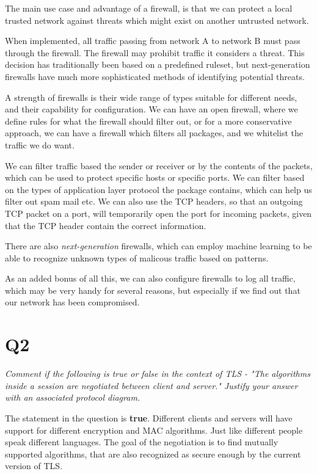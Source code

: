 \documentclass{article}
\begin{document}
The main use case and advantage of a firewall, is that we can protect a local trusted network against threats which might exist on another untrusted network.

When implemented, all traffic passing from network A to network B must pass through the firewall. The firewall may prohibit traffic it considers a threat. This decision has traditionally been based on a predefined ruleset, but next-generation firewalls have much more sophisticated methods of identifying potential threats.

A strength of firewalls is their wide range of types suitable for different needs, and their capability for configuration. We can have an open firewall, where we define rules for what the firewall should filter out, or for a more conservative approach, we can have a firewall which filters all packages, and we whitelist the traffic we do want.

We can filter traffic based the sender or receiver or by the contents of the packets, which can be used to protect specific hosts or specific ports. We can filter based on the types of application layer protocol the package contains, which can help us filter out spam mail etc. We can also use the TCP headers, so that an outgoing TCP packet on a port, will temporarily open the port for incoming packets, given that the TCP header contain the correct information.

There are also \textit{next-generation} firewalls, which can employ machine learning to be able to recognize unknown types of malicous traffic based on patterns.

As an added bonus of all this, we can also configure firewalls to log all traffic, which may be very handy for several reasons, but especially if we find out that our network has been compromised.


\newpage
\section{Q2}
\begin{tcolorbox}
  \textit{Comment if the following is true or false in the context of TLS - "The algorithms inside a session are negotiated between client and server." Justify your answer with an associated protocol diagram.}
\end{tcolorbox}
The statement in the question is \textbf{true}. Different clients and servers will have support for different encryption and MAC algorithms. Just like different people speak different languages. The goal of the negotiation is to find mutually supported algorithms, that are also recognized as secure enough by the current version of TLS.
\end{document}
